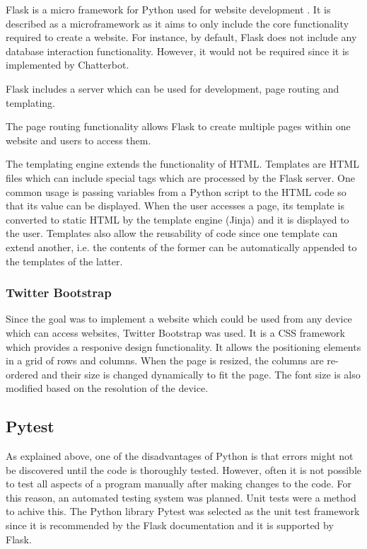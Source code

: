 \documentclass[12pt,a4paper]{article}
\begin{document}
Flask is a micro framework for Python used for website development \citep{Flask:online}. It is described as a microframework as it aims to only include the core functionality required to create a website. For instance, by default, Flask does not include any database interaction functionality. However, it would not be required since it is implemented by Chatterbot.

Flask includes a server which can be used for development, page routing and templating. 

The page routing functionality allows Flask to create multiple pages within one website and users to access them.

The templating engine extends the functionality of HTML. Templates are HTML files which can include special tags which are processed by the Flask server. One common usage is passing variables from a Python script to the HTML code so that its value can be displayed. When the user accesses a page, its template is converted to static HTML by the template engine (Jinja) and it is displayed to the user. Templates also allow the reusability of code since one template can extend another, i.e. the contents of the former can be automatically appended to the templates of the latter.
 
\subsubsection{Twitter Bootstrap}
Since the goal was to implement a website which could be used from any device which can access websites, Twitter Bootstrap was used. It is a CSS framework which provides a responive design functionality. It allows the positioning elements in a grid of rows and columns. When the page is resized, the columns are re-ordered and their size is changed dynamically to fit the page. The font size is also modified based on the resolution of the device.

\subsection{Pytest}
As explained above, one of the disadvantages of Python is that errors might not be discovered until the code is thoroughly tested. However, often it is not possible to test all aspects of a program manually after making changes to the code. For this reason, an automated testing system was planned. Unit tests were a method to achive this. The Python library Pytest was selected as the unit test framework since it is recommended by the Flask documentation \citep{Flask:online} and it is supported by Flask.
\end{document}
